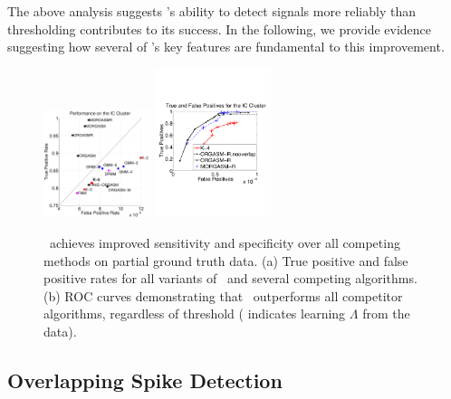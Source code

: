 The above analysis suggests \smug's ability to detect signals more reliably than thresholding contributes to its success.  In the following, we provide evidence suggesting how several of \smug's key features are fundamental to this improvement.
%
\begin{center}
\begin{figure}
	\includegraphics[width=0.28\textwidth]{../figs/truefalsepositive.pdf}
	\includegraphics[width=0.3\textwidth]{../figs/new/icroc.pdf}
\caption{\smug\ achieves improved sensitivity and specificity over all competing methods on partial ground truth data. %
(a) True positive and false positive rates for all variants of \smug\ and several competing 
algorithms.  
(b) ROC curves demonstrating that \smug\ outperforms all competitor algorithms, regardless of threshold (\jovo{*} indicates learning $\Lambda$ from the data).}
\end{figure}
\end{center}
% 
% 
% 
\vspace{-10pt}
\subsection{Overlapping Spike Detection}



